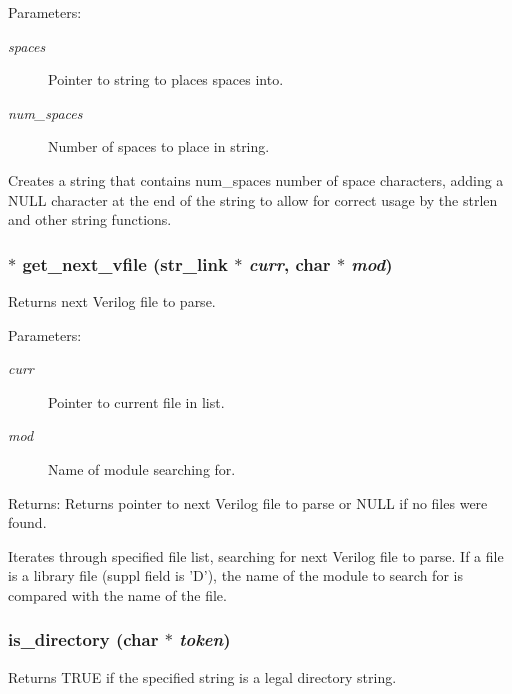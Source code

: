 \begin{Desc}
\item[Parameters:]
\begin{description}
\item[{\em spaces}]Pointer to string to places spaces into. \item[{\em num\_\-spaces}]Number of spaces to place in string.\end{description}
\end{Desc}
Creates a string that contains num\_\-spaces number of space characters, adding a NULL character at the end of the string to allow for correct usage by the strlen and other string functions. 
\subsubsection{$\ast$ get\_\-next\_\-vfile ({\bf str\_\-link} $\ast$ {\em curr}, char $\ast$ {\em mod})}\label{util_8h_a12}


Returns next Verilog file to parse.

\begin{Desc}
\item[Parameters:]
\begin{description}
\item[{\em curr}]Pointer to current file in list. \item[{\em mod}]Name of module searching for.\end{description}
\end{Desc}
\begin{Desc}
\item[Returns:]Returns pointer to next Verilog file to parse or NULL if no files were found.\end{Desc}
Iterates through specified file list, searching for next Verilog file to parse. If a file is a library file (suppl field is 'D'), the name of the module to search for is compared with the name of the file. 
\subsubsection{ is\_\-directory (char $\ast$ {\em token})}\label{util_8h_a4}


Returns TRUE if the specified string is a legal directory string.

